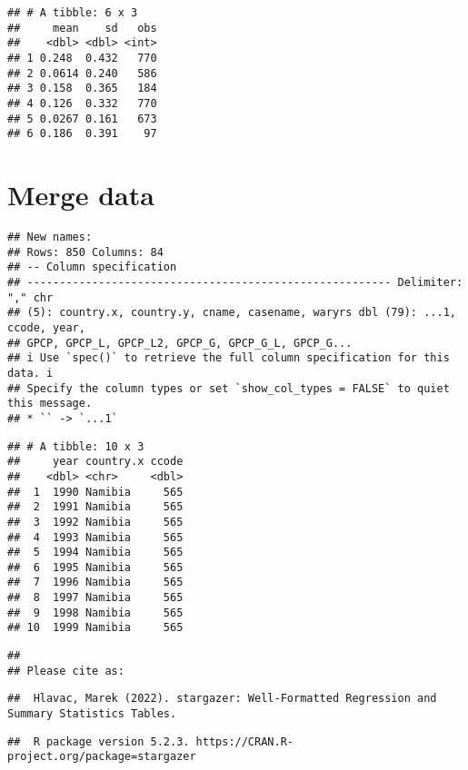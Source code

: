 \documentclass[
]{article}
\begin{document}
\begin{verbatim}
## # A tibble: 6 x 3
##     mean    sd   obs
##    <dbl> <dbl> <int>
## 1 0.248  0.432   770
## 2 0.0614 0.240   586
## 3 0.158  0.365   184
## 4 0.126  0.332   770
## 5 0.0267 0.161   673
## 6 0.186  0.391    97
\end{verbatim}

\hypertarget{merge-data}{%
\section{Merge data}\label{merge-data}}

\begin{verbatim}
## New names:
## Rows: 850 Columns: 84
## -- Column specification
## -------------------------------------------------------- Delimiter: "," chr
## (5): country.x, country.y, cname, casename, waryrs dbl (79): ...1, ccode, year,
## GPCP, GPCP_L, GPCP_L2, GPCP_G, GPCP_G_L, GPCP_G...
## i Use `spec()` to retrieve the full column specification for this data. i
## Specify the column types or set `show_col_types = FALSE` to quiet this message.
## * `` -> `...1`
\end{verbatim}

\begin{verbatim}
## # A tibble: 10 x 3
##     year country.x ccode
##    <dbl> <chr>     <dbl>
##  1  1990 Namibia     565
##  2  1991 Namibia     565
##  3  1992 Namibia     565
##  4  1993 Namibia     565
##  5  1994 Namibia     565
##  6  1995 Namibia     565
##  7  1996 Namibia     565
##  8  1997 Namibia     565
##  9  1998 Namibia     565
## 10  1999 Namibia     565
\end{verbatim}

\begin{verbatim}
## 
## Please cite as:
\end{verbatim}

\begin{verbatim}
##  Hlavac, Marek (2022). stargazer: Well-Formatted Regression and Summary Statistics Tables.
\end{verbatim}

\begin{verbatim}
##  R package version 5.2.3. https://CRAN.R-project.org/package=stargazer
\end{verbatim}
\end{document}
